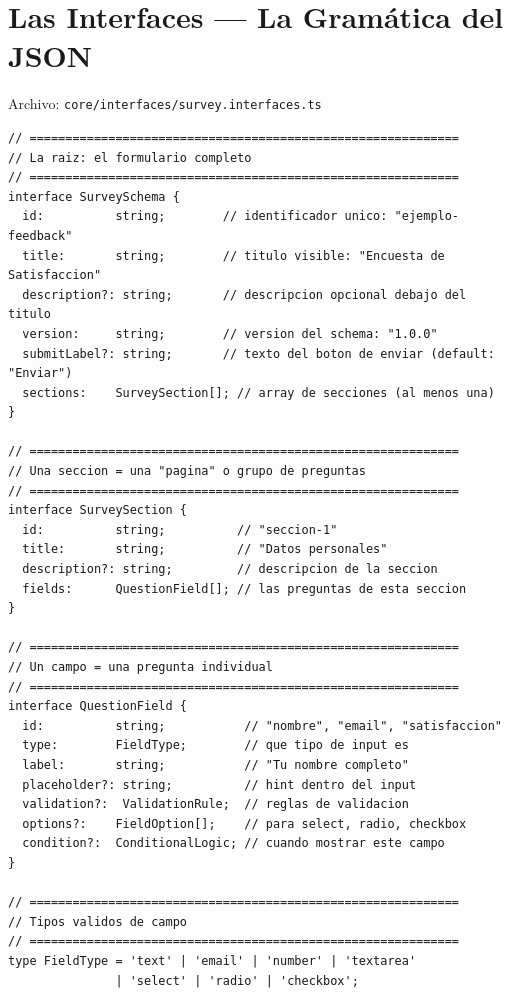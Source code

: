 \documentclass[12pt, a4paper]{article}
\begin{document}
\section{  Las Interfaces --- La Gramática del JSON}

Archivo: \textcolor{morado}{\texttt{core/interfaces/survey.interfaces.ts}}

\begin{lstlisting}
// ============================================================
// La raiz: el formulario completo
// ============================================================
interface SurveySchema {
  id:          string;        // identificador unico: "ejemplo-feedback"
  title:       string;        // titulo visible: "Encuesta de Satisfaccion"
  description?: string;       // descripcion opcional debajo del titulo
  version:     string;        // version del schema: "1.0.0"
  submitLabel?: string;       // texto del boton de enviar (default: "Enviar")
  sections:    SurveySection[]; // array de secciones (al menos una)
}

// ============================================================
// Una seccion = una "pagina" o grupo de preguntas
// ============================================================
interface SurveySection {
  id:          string;          // "seccion-1"
  title:       string;          // "Datos personales"
  description?: string;         // descripcion de la seccion
  fields:      QuestionField[]; // las preguntas de esta seccion
}

// ============================================================
// Un campo = una pregunta individual
// ============================================================
interface QuestionField {
  id:          string;           // "nombre", "email", "satisfaccion"
  type:        FieldType;        // que tipo de input es
  label:       string;           // "Tu nombre completo"
  placeholder?: string;          // hint dentro del input
  validation?:  ValidationRule;  // reglas de validacion
  options?:    FieldOption[];    // para select, radio, checkbox
  condition?:  ConditionalLogic; // cuando mostrar este campo
}

// ============================================================
// Tipos validos de campo
// ============================================================
type FieldType = 'text' | 'email' | 'number' | 'textarea'
               | 'select' | 'radio' | 'checkbox';


\end{lstlisting}
\end{document}
